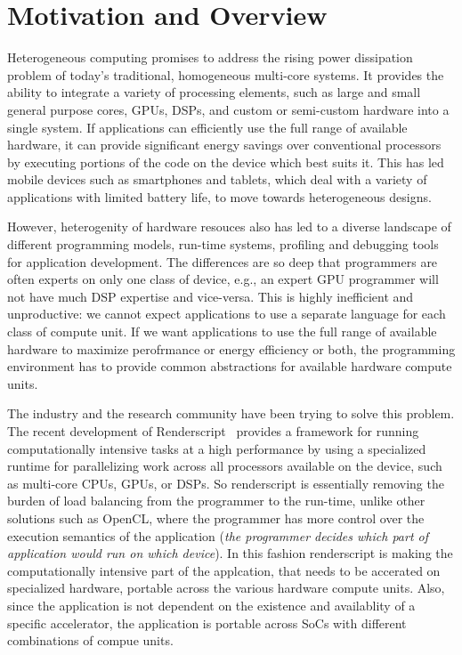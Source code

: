 \section{Motivation and Overview}
Heterogeneous computing promises to address the rising power dissipation problem
of today's traditional, homogeneous multi-core
systems. It provides the ability to integrate a variety of processing elements,
such as large and small general purpose cores, GPUs, DSPs, and custom or
semi-custom hardware into a single system. If applications can efficiently use
the full range of available hardware, it can provide significant energy
savings over conventional processors by executing portions of the code on the
device which best suits it. This has led mobile devices such as smartphones
and tablets, which deal with a variety of applications with limited battery
life, to move towards heterogeneous designs.

However, heterogenity of hardware resouces also has led to a diverse landscape
of different programming models, run-time systems, profiling and debugging tools
for application development. The differences are so deep that programmers are
often experts on only one class of device, e.g., an expert GPU programmer will
not have much DSP expertise and vice-versa. This is highly inefficient and
unproductive: we cannot expect applications to use a separate language for each
class of compute unit. If we want applications to use the full range of
available hardware to maximize perofrmance or energy efficiency or both, the
programming environment has to provide common abstractions for available
hardware compute units.

The industry and the research community have been trying to solve this problem.
The recent development of Renderscript~\cite{Renderscript} provides a framework
for running computationally intensive tasks at a high performance by using a
specialized runtime for 
parallelizing work across all processors available on the device, such as
multi-core CPUs, GPUs, or DSPs. So renderscript is essentially removing the
burden of load balancing from the programmer to the run-time, unlike other
solutions such as OpenCL, where the programmer has more control over the
execution semantics of the application ({\em the programmer decides which part
of application would run on which device}). In this fashion renderscript is
making the computationally intensive part of the applcation, that needs to be
accerated on specialized hardware, portable across the various hardware compute
units. Also, since the application is not dependent on the existence and
availablity of a specific accelerator, the application is portable across SoCs
with different combinations of compue units.

